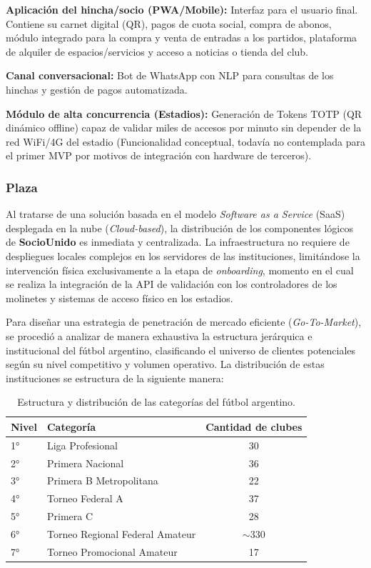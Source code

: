 \textbf{Aplicación del hincha/socio (PWA/Mobile):} Interfaz para el usuario final. Contiene su carnet digital (QR), pagos de cuota social, compra de abonos, módulo integrado para la compra y venta de entradas a los partidos, plataforma de alquiler de espacios/servicios y acceso a noticias o tienda del club.

\textbf{Canal conversacional:} Bot de WhatsApp con NLP para consultas de los hinchas y gestión de pagos automatizada.

\textbf{Módulo de alta concurrencia (Estadios):} Generación de Tokens TOTP (QR dinámico offline) capaz de validar miles de accesos por minuto sin depender de la red WiFi/4G del estadio (Funcionalidad conceptual, todavía no contemplada para el primer MVP por motivos de integración con hardware de terceros).

\subsubsection*{Plaza}

Al tratarse de una solución basada en el modelo \textit{Software as a Service} (SaaS) desplegada en la nube (\textit{Cloud-based}), la distribución de los componentes lógicos de \textbf{SocioUnido} es inmediata y centralizada. La infraestructura no requiere de despliegues locales complejos en los servidores de las instituciones, limitándose la intervención física exclusivamente a la etapa de \textit{onboarding}, momento en el cual se realiza la integración de la API de validación con los controladores de los molinetes y sistemas de acceso físico en los estadios.

Para diseñar una estrategia de penetración de mercado eficiente (\textit{Go-To-Market}), se procedió a analizar de manera exhaustiva la estructura jerárquica e institucional del fútbol argentino, clasificando el universo de clientes potenciales según su nivel competitivo y volumen operativo. La distribución de estas instituciones se estructura de la siguiente manera:

\begin{table}[h!]
\centering
\renewcommand{\arraystretch}{1.3}
\begin{tabular}{|l|l|c|}
\hline
\rowcolor{gray!20} \textbf{Nivel} & \textbf{Categoría} & \textbf{Cantidad de clubes} \\ \hline
1° & Liga Profesional & 30 \\ \hline
2° & Primera Nacional & 36 \\ \hline
3° & Primera B Metropolitana & 22 \\ \hline
4° & Torneo Federal A & 37 \\ \hline
5° & Primera C & 28 \\ \hline
6° & Torneo Regional Federal Amateur & $\sim$330 \\ \hline
7° & Torneo Promocional Amateur & 17 \\ \hline
\end{tabular}
\caption{Estructura y distribución de las categorías del fútbol argentino.}
\label{tab:categorias_futbol}
\end{table}

